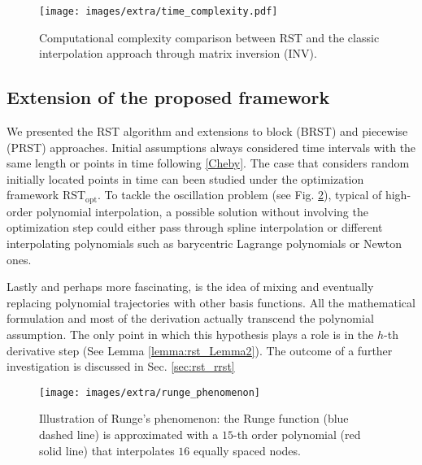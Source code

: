 \begin{figure}
\texttt{[image: images/extra/time\_complexity.pdf]}
\centering
\vspace{-0.1em}
\caption{Computational complexity comparison between RST and the classic interpolation approach through matrix inversion (INV).}
\vspace{-1.0em}
\label{fig:rst_time_complexity}
\end{figure}


\subsection{Extension of the proposed framework}
We presented the RST algorithm and extensions to block (BRST) and piecewise (PRST) approaches. Initial assumptions always considered time intervals with the same length or points in time following \eqref{Cheby}. The case that considers random initially located points in time can been studied under the optimization framework RST$_{\text{opt}}$. To tackle the oscillation problem (see Fig. \ref{fig:rst_Runge}), typical of high-order polynomial interpolation, a possible solution without involving the optimization step could either pass through spline interpolation or different interpolating polynomials such as barycentric Lagrange polynomials \cite{Berrut} or Newton ones.

Lastly and perhaps more fascinating, is the idea of mixing and eventually replacing polynomial trajectories with other basis functions. All the mathematical formulation and most of the derivation actually transcend the polynomial assumption. The only point in which this hypothesis plays a role is in the $h$-th derivative step (See Lemma \ref{lemma:rst_Lemma2}). The outcome of a further investigation is discussed in Sec. \ref{sec:rst_rrst}

\begin{figure}
\texttt{[image: images/extra/runge\_phenomenon]}
\centering
\caption{Illustration of Runge's phenomenon: the Runge function (blue dashed line) is approximated with a $15$-th order polynomial (red solid line) that interpolates $16$ equally spaced nodes.}
\label{fig:rst_Runge}
\end{figure}